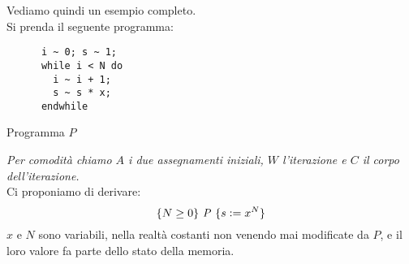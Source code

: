				      		\begin{esempio}
				      			Vediamo quindi un esempio completo.\\
				      			Si prenda il seguente programma:
				      			\begin{listing}[H]
				      				\begin{lstlisting}
      i ~ 0; s ~ 1;
      while i < N do
        i ~ i + 1;
        s ~ s * x;
      endwhile  
				      				\end{lstlisting}
				      				\caption{Programma $P$}
				      				\label{E:W}
				      			\end{listing}
				      			\textit{Per comodità chiamo $A$ i due assegnamenti iniziali,
				      				$W$ l'iterazione e $C$ il corpo dell'iterazione.}\\
				      			Ci proponiamo di derivare:
				      			\[\{N\geq 0\}\mbox{ \textit{P} }\{s\cceq x^N\}\]
				      			$x$ e $N$ sono variabili, nella realtà costanti non venendo mai modificate da
				      			$P$, e il loro valore fa parte dello stato della memoria.\\
				      			  

\end{esempio}

